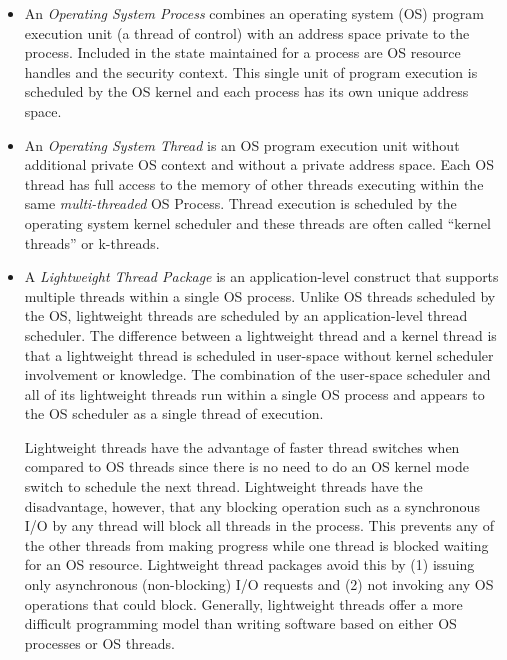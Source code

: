 \documentclass[a4paper,11pt,twoside,openright]{book}
\begin{document}
\begin{itemize}

\item
  An \emph{Operating System Process} combines an operating system (OS)
  program execution unit (a thread of control) with an address space private to the process. Included in the state maintained
for a process are OS resource handles and the security context. This
single unit of program execution is scheduled by the OS kernel and each
process has its own unique address space.
\item
  An \emph{Operating System Thread} is an OS program execution unit
  without additional private OS context and without a private address
  space. Each OS thread has full access to the memory of other threads
  executing within the same \emph{multi-threaded} OS Process. Thread
  execution is scheduled by the operating system kernel scheduler and
  these threads are often called ``kernel threads'' or k-threads.
\item
  A \emph{Lightweight Thread Package} is an application-level construct
  that supports multiple threads within a single OS process. Unlike OS
  threads scheduled by the OS, lightweight threads are scheduled by an
  application-level thread scheduler. The difference between a
  lightweight thread and a kernel thread is that a lightweight thread is
  scheduled in user-space without kernel scheduler involvement or
  knowledge. The combination of the user-space scheduler and all of its
  lightweight threads run within a single OS process and appears to the
  OS scheduler as a single thread of execution.

Lightweight threads have the advantage of faster thread switches when
compared to OS threads since there is no need to do an OS kernel mode
switch to schedule the next thread. Lightweight threads have the
disadvantage, however, that any blocking operation such as a
synchronous I/O by any thread will block all threads in the process.
This prevents any of the other threads from making progress while one
thread is blocked waiting for an OS resource. Lightweight thread
packages avoid this by (1) issuing only asynchronous (non-blocking) I/O
requests and (2) not invoking any OS operations that could block.
Generally, lightweight threads offer a more difficult programming model
than writing software based on either OS processes or OS threads.


\end{itemize}
\end{document}
